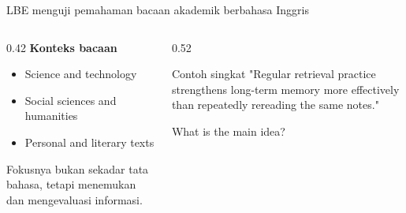 \begin{frame}{LBE menguji pemahaman bacaan akademik berbahasa Inggris}
  \begin{columns}[T,onlytextwidth]
    \begin{column}{0.42\textwidth}
      {\color{StudentBlue}\bfseries Konteks bacaan}\par
      \begin{itemize}
        \item Science and technology
        \item Social sciences and humanities
        \item Personal and literary texts
      \end{itemize}
      \vspace{0.10cm}
      {\color{StudentGray}\fontsize{10.5}{13}\selectfont Fokusnya bukan sekadar tata bahasa, tetapi menemukan dan mengevaluasi informasi.}
    \end{column}
    \begin{column}{0.52\textwidth}
      \begin{block}{Contoh singkat}
        "Regular retrieval practice strengthens long-term memory more effectively than repeatedly rereading the same notes."

        What is the main idea?

      \end{block}
    \end{column}
  \end{columns}
\end{frame}

